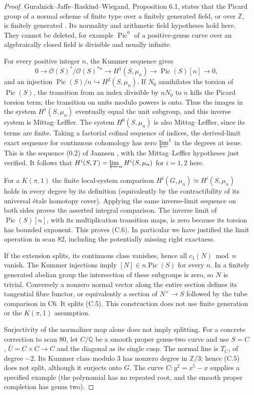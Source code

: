 \begin{proof}
Guralnick--Jaffe--Raskind--Wiegand, Proposition 6.1, states that the Picard
group of a normal scheme of finite type over a finitely generated field,
or over $\mathbb Z$, is finitely generated \cite{CF_GJRW1996}. Its
normality and arithmetic field hypotheses hold here. They cannot be
deleted, for example $\operatorname{Pic}^0$ of a positive-genus curve
over an algebraically closed field is divisible and usually infinite.

For every positive integer $n$, the Kummer sequence gives
\[
 0\to\mathcal O(S)^*/\mathcal O(S)^{*n}
  \to H^1(S,\mu_n)\to\operatorname{Pic}(S)[n]\to0,
\]
and an injection
$\operatorname{Pic}(S)/n\hookrightarrow H^2(S,\mu_n)$.
If $N_0$ annihilates the torsion of $\operatorname{Pic}(S)$, the
transition from an index divisible by $nN_0$ to $n$ kills the Picard
torsion term; the transition on units modulo powers is onto. Thus the
images in the system $H^1(S,\mu_n)$ eventually equal the unit subgroup,
and this inverse system is Mittag--Leffler. The system $H^0(S,\mu_n)$
is also Mittag--Leffler, since its terms are finite. Taking a factorial
cofinal sequence of indices, the derived-limit exact sequence for
continuous cohomology has zero $\varprojlim^1$ in the degrees at issue.
This is the sequence (0.2) of Jannsen \cite{CF_Jannsen1988}, with
the Mittag--Leffler hypotheses just verified. It follows that
$H^i(S,T)=\varprojlim_nH^i(S,\mu_n)$ for $i=1,2$ here.

For a $K(\pi,1)$ the finite local-system comparison
$H^i(G,\mu_n)\simeq H^i(S,\mu_n)$ holds in every degree by its
definition (equivalently by the contractibility of its universal
\'etale homotopy cover). Applying the same inverse-limit sequence on
both sides proves the asserted integral comparison. The inverse
limit of $\operatorname{Pic}(S)[n]$, with its multiplication transition
maps, is zero because its torsion has bounded exponent. This proves
(C.6). In particular we have justified the limit operation in scan 82,
including the potentially missing right exactness.

If the extension splits, its continuous class vanishes, hence all
$c_1(N)\bmod n$ vanish. The Kummer injections imply
$[N]\in n\operatorname{Pic}(S)$ for every $n$. In a finitely generated
abelian group the intersection of these subgroups is zero, so $N$ is
trivial. Conversely a nonzero normal vector along the entire section
defines its tangential fibre functor, or equivalently a section of
$N^\times\to S$ followed by the tube comparison in C6. It splits
(C.5). This construction does not use finite generation or the
$K(\pi,1)$ assumption.

Surjectivity of the normalizer map alone does not imply splitting.
For a concrete correction to scan 80, let $C/\mathbb Q$ be a smooth
proper genus-two curve and use $S=C$,
$\bar U=C\times C\to C$ and the diagonal as its single cusp. The
normal line is $T_C$, of degree $-2$. Its Kummer class modulo $3$ has
nonzero degree in $\mathbb Z/3$; hence (C.5) does not split, although
it surjects onto $G$. The curve $C:y^2=x^5-x$ supplies a specified
example (the polynomial has no repeated root, and the smooth proper
completion has genus two).
\end{proof}

